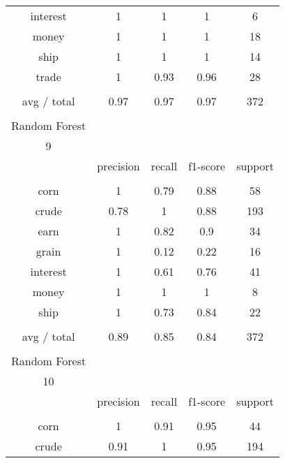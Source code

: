 \documentclass[11pt]{article}
\begin{document}
\begin{center}
\begin{longtable}{| c | c | c | c | c |}
interest      & 1         & 1      & 1        & 6       \\
money         & 1         & 1      & 1        & 18      \\
ship          & 1         & 1      & 1        & 14      \\
trade         & 1         & 0.93   & 0.96     & 28      \\
             &           &        &          &         \\
avg / total   & 0.97      & 0.97   & 0.97     & 372     \\
             &           &        &          &         \\
Random Forest &           &        &          &         \\
9             &           &        &          &         \\
             & precision & recall & f1-score & support \\
             &           &        &          &         \\
corn          & 1         & 0.79   & 0.88     & 58      \\
crude         & 0.78      & 1      & 0.88     & 193     \\
earn          & 1         & 0.82   & 0.9      & 34      \\
grain         & 1         & 0.12   & 0.22     & 16      \\
interest      & 1         & 0.61   & 0.76     & 41      \\
money         & 1         & 1      & 1        & 8       \\
ship          & 1         & 0.73   & 0.84     & 22      \\
             &           &        &          &         \\
avg / total   & 0.89      & 0.85   & 0.84     & 372     \\
             &           &        &          &         \\
Random Forest &           &        &          &         \\
10            &           &        &          &         \\
             & precision & recall & f1-score & support \\
             &           &        &          &         \\
corn          & 1         & 0.91   & 0.95     & 44      \\
crude         & 0.91      & 1      & 0.95     & 194     \\

\end{longtable}
\end{center}
\end{document}
